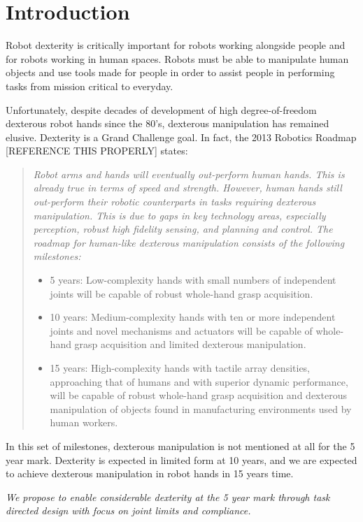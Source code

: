 \section{Introduction}

Robot dexterity is critically important for robots working alongside people and for robots working in human spaces.    Robots must be able to manipulate human objects and use tools made for people in order to assist people in performing tasks from mission critical to everyday.   

Unfortunately, despite decades of development of high degree-of-freedom dexterous robot hands since the 80's, dexterous manipulation has remained elusive.  Dexterity is a Grand Challenge goal.   In fact, the 2013 Robotics Roadmap [REFERENCE THIS PROPERLY] states:
\begin{quotation}
{\small \it
Robot arms and hands will eventually out-perform human hands. This is already true in terms of speed and strength. However, human hands still out-perform their robotic counterparts in tasks requiring dexterous manipulation. This is due to gaps in key technology areas, especially perception, robust high fidelity sensing, and planning and control. The roadmap for human-like dexterous manipulation consists of the following milestones:
\begin{itemize}
	\item 5 years: Low-complexity hands with small numbers of independent joints will be capable of robust whole-hand grasp acquisition.
	\item 10 years: Medium-complexity hands with ten or more independent joints and novel mechanisms and actuators will be capable of whole-hand grasp acquisition and limited dexterous manipulation.
	\item 15 years: High-complexity hands with tactile array densities, approaching that of humans and with superior dynamic performance, will be capable of robust whole-hand grasp acquisition and dexterous manipulation of objects found in manufacturing environments used by human workers.
\end{itemize}}
\end{quotation}
In this set of milestones, dexterous manipulation is not mentioned at all for the 5 year mark.   Dexterity is expected in limited form at 10 years, and we are expected to achieve dexterous manipulation in robot hands in 15 years time.

{\it We propose to enable considerable dexterity at the 5 year mark through task directed design with focus on joint limits and compliance.}

